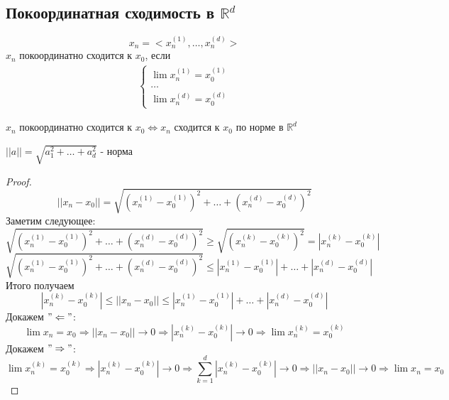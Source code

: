 \subsection{Покоординатная сходимость в $\mathbb{R}^d$}
    \[ x_n = <x_n^{(1)}, \dots, x_n^{(d)}> \]
    $x_n$ покоординатно сходится к $x_0$, если \\
    \begin{gather*}
        \begin{cases}
            \lim x_n^{(1)} = x_0^{(1)} \\
            \dots \\
            \lim x_n^{(d)} = x_0^{(d)}
        \end{cases}
    \end{gather*}
    
    \begin{theorem-non} \end{theorem-non}
    $x_n$ покоординатно сходится к $x_0 \Longleftrightarrow x_n$ сходится к $x_0$ по норме в $\mathbb{R}^d$ 
    
    $||a|| = \sqrt{a_1^2 + \dots + a_d^2}$ - норма
    
    \begin{proof}
        \[ ||x_n - x_0|| = \sqrt{(x_n^{(1)} - x_0^{(1)})^2 + \dots + (x_n^{(d)} - x_0^{(d)})^2} \]
        Заметим следующее: 
        \[ \sqrt{(x_n^{(1)} - x_0^{(1)})^2 + \dots + (x_n^{(d)} - x_0^{(d)})^2} \geqslant \sqrt{(x_n^{(k)} - x_0^{(k)})^2} = |x_n^{(k)} - x_0^{(k)}| \]
        \[  \sqrt{(x_n^{(1)} - x_0^{(1)})^2 + \dots + (x_n^{(d)} - x_0^{(d)})^2} \leqslant |x_n^{(1)} - x_0^{(1)}| + \dots + |x_n^{(d)} - x_0^{(d)}| \]
        Итого получаем
        \[ |x_n^{(k)} - x_0^{(k)}| \leqslant ||x_n - x_0|| \leqslant |x_n^{(1)} - x_0^{(1)}| + \dots + |x_n^{(d)} - x_0^{(d)}| \]
        Докажем $"\Leftarrow"$:
        \[ \lim x_n = x_0 \Rightarrow ||x_n - x_0|| \to 0 \Rightarrow  |x_n^{(k)} - x_0^{(k)}| \to 0 \Rightarrow \lim x_n^{(k)} = x_0^{(k)} \]
        Докажем $"\Rightarrow"$:
        \[ \lim x_n^{(k)} = x_0^{(k)} \Rightarrow |x_n^{(k)} - x_0^{(k)}| \to 0 \Rightarrow \sum_{k = 1}^d |x_n^{(k)} - x_0^{(k)}| \to 0 \Rightarrow ||x_n - x_0|| \to 0 \Rightarrow \lim x_n = x_0  \]
    \end{proof}